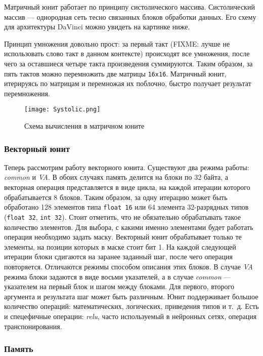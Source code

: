 Матричный юнит работает по принципу систолического массива.
Систолический массив --- однородная сеть тесно связанных блоков обработки данных.
Его схему для архитектуры DaVinci можно увидеть на картинке ниже.

Принцип умножения довольно прост: за первый такт (FIXME: лучше не использовать
слово такт в данном контексте) происходят все умножения,
после чего за оставшиеся четыре такта произведения суммируются. Таким
образом, за пять тактов можно перемножить две матрицы \texttt{16x16}.
Матричный юнит, итерируясь по матрицам и перемножая их поблочно, быстро
получает результат перемножения.

\begin{figure}[h!]
    \centering
    \texttt{[image: Systolic.png]}
    \caption{Схема вычисления в матричном юните}
\end{figure}

\subsubsection{Векторный юнит}

Теперь рассмотрим работу векторного юнита. Существуют два режима работы:
\textit{common} и \textit{VA}. В обоих случаях память делится на блоки
по 32 байта, а векторная операция представляется в виде цикла, на каждой
итерации которого обрабатывается 8 блоков. Таким образом, за одну итерацию
может быть обработано 128 элементов типа \texttt{float 16} или 64 элемента
32-разрядных типов (\texttt{float 32}, \texttt{int 32}). Стоит отметить, что
не обязательно обрабатывать такое количество элементов. Для выбора, с какими
именно элементами будет работать операция необходимо задать маску. Векторный
юнит обрабатывает только те элементы, на позиции которых в маске стоит бит 1.
На каждой следующей итерации блоки сдигаются на заранее заданный шаг,
после чего операция повторяется. Отличаются режимы способом описания этих блоков.
В случае \textit{VA} режима блоки задаются в виде восьми указателей, а в случае
\textit{common} --- указателем на первый блок и шагом между блоками. Для первого,
второго аргумента и результата шаг может быть различным. 
Юнит поддерживает большое количество операций: математических, логических,
приведения типов и т.~д. Есть и спецефичные операции: \textit{relu}, часто
используемый в нейронных сетях, операция транспонирования.

\subsubsection{Память}

